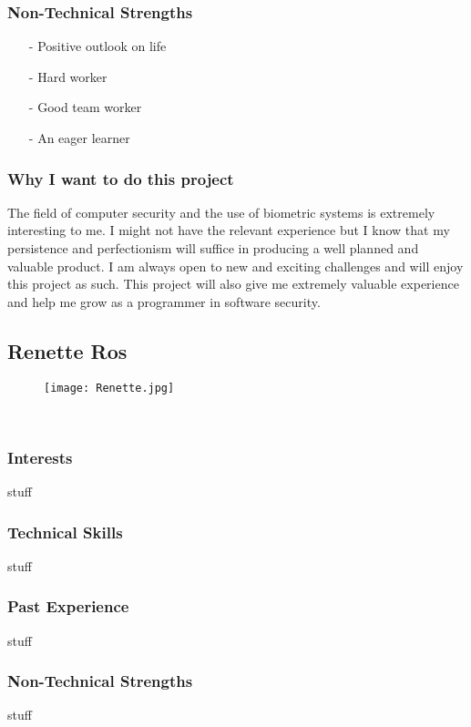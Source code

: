 \subsubsection{Non-Technical Strengths}
\begin{itemize}
	\item[-]{Positive outlook on life}
	\item[-]{Hard worker}
	\item[-]{Good team worker}
	\item[-]{An eager learner}
\end{itemize}
\subsubsection{Why I want to do this project}
The field of computer security and the use of biometric systems is extremely interesting to me. I might not have the relevant experience but I know that my persistence and perfectionism will suffice in producing a well planned and valuable product. I am always open to new and exciting challenges and will enjoy this project as such. This project will also give me extremely valuable experience and help me grow as a programmer in software security.

\subsection{Renette Ros}
\begin{wrapfigure}[8]{l}{0.25\textwidth}
\vspace{10pt}
\texttt{[image: Renette.jpg]}
\vspace{10pt}
\end{wrapfigure}

\textcolor{white}{.}
\subsubsection{Interests} stuff
\subsubsection{Technical Skills} stuff
\subsubsection{Past Experience} stuff
\subsubsection{Non-Technical Strengths} stuff

